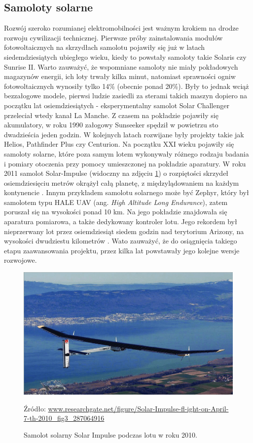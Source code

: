 \documentclass[12pt, a4paper]{article}
\begin{document}
\subsection{Samoloty solarne}
Rozwój szeroko rozumianej elektromobilności jest ważnym krokiem na drodze rozwoju cywilizacji technicznej. Pierwsze próby zainstalowania modułów fotowoltaicznych na skrzydłach samolotu pojawiły się już w latach siedemdziesiątych ubiegłego wieku, kiedy to powstały samoloty takie Solaris czy Sunrise II. Warto zauważyć, że wspomniane samoloty nie miały pokładowych magazynów energii, ich loty trwały kilka minut, natomiast sprawności ogniw fotowoltaicznych wynosiły tylko 14\% (obecnie ponad 20\%). Były to jednak wciąż bezzałogowe modele, pierwsi ludzie zasiedli za sterami takich maszyn dopiero na początku lat osiemdziesiątych - eksperymentalny samolot Solar Challenger przeleciał wtedy kanał La Manche. Z czasem na pokładzie pojawiły się akumulatory, w roku 1990 załogowy Sunseeker spędził w powietrzu sto dwadzieścia jeden godzin. W kolejnych latach rozwijane były projekty takie jak Helios, Pathfinder Plus czy Centurion. Na początku XXI wieku pojawiły się samoloty solarne, które poza samym lotem wykonywały różnego rodzaju badania i pomiary otoczenia przy pomocy umieszczonej na pokładzie aparatury. W roku 2011 samolot Solar-Impulse (widoczny na zdjęciu \ref{fig:solimp}) o rozpiętości skrzydeł osiemdziesięciu metrów okrążył całą planetę, z międzylądowaniem na każdym kontynencie \cite{Engel2007}. Innym przykładem samolotu solarnego może być Zephyr, który był samolotem typu HALE UAV (ang. \textit{High Altitude Long Endurance}), zatem poruszał się na wysokości ponad 10 km. Na jego pokładzie znajdowała się aparatura pomiarowa, a także dedykowany kontroler lotu. Jego rekordem był nieprzerwany lot przez osiemdziesiąt siedem godzin nad terytorium Arizony, na wysokości dwudziestu kilometrów \cite{Rapinett2009}. Wato zauważyć, że do osiągnięcia takiego etapu zaawansowania projektu, przez kilka lat powstawały jego kolejne wersje rozwojowe.

\begin{figure}[ht]
    \centering
    \includegraphics[width=1\textwidth]{solarimpulse}
    \caption{Samolot solarny Solar Impulse podczas lotu w roku 2010.}
    \small Źródło: \url{www.researchgate.net/figure/Solar-Impulse-fl-ight-on-April-7-th-2010_fig3_287064916}
    \label{fig:solimp}
\end{figure}
\end{document}

